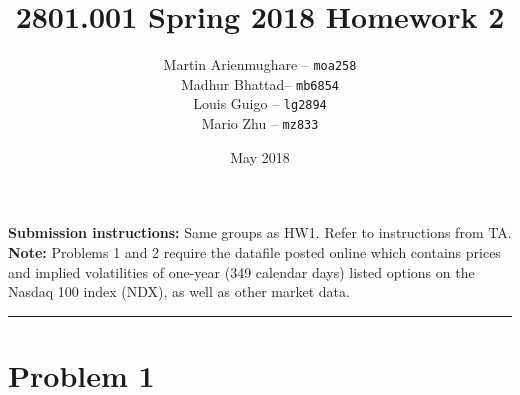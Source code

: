 \documentclass[12pt]{article}
\title{\vspace{-3cm}2801.001 Spring 2018 Homework 2 }
\author{Martin Arienmughare -- \texttt{moa258}\\
		Madhur Bhattad-- \texttt{mb6854}\\
		Louis Guigo -- \texttt{lg2894}\\
		Mario Zhu -- \texttt{mz833}}
\date{May 2018}
\begin{document}
\maketitle

\textbf{Submission instructions:} Same groups as HW1. Refer to instructions from TA.
\\

\textbf{Note:} Problems 1 and 2 require the datafile posted online which contains prices and implied volatilities of one-year (349 calendar days) listed options on the Nasdaq 100 index (NDX), as well as other market data.

\noindent
\rule{\linewidth}{0.4pt}

\section*{Problem 1}
\end{document}
